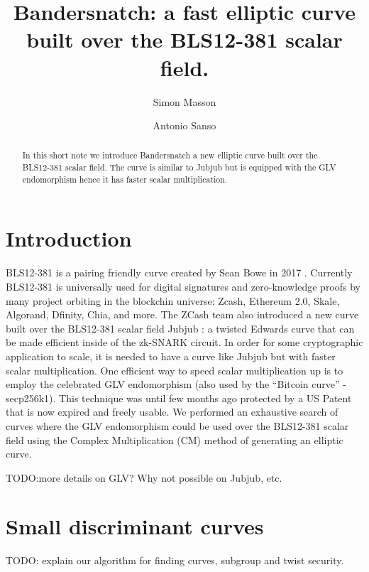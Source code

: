 \documentclass{amsart}
\newcommand{\SM}[1]{\color{blue}#1\color{black}}
\begin{document}
\title[Bandersnatch]{Bandersnatch: a fast elliptic curve built over the BLS12-381 scalar field.}
\author{Simon Masson}
\address{Heliax}
\author{Antonio Sanso}
\address{Ethereum Foundation and Ruhr Universit{\"a}t Bochum}


\maketitle
\medskip
\begin{abstract}
 In this short note we  introduce Bandersnatch a new elliptic curve built over the BLS12-381 \cite{bls12381} scalar field. The curve is similar to Jubjub \cite{jubjub} but is equipped with the GLV endomorphism \cite{10.1007/3-540-44647-8_11} hence it has faster scalar multiplication.
 \end{abstract}

\section{Introduction}
BLS12-381 is a pairing friendly curve created by Sean Bowe in 2017
\cite{bls12381}. Currently BLS12-381 is universally used for digital
signatures and zero-knowledge proofs by many project orbiting in the
blockchin universe: Zcash, Ethereum 2.0, Skale, Algorand, Dfinity,
Chia, and more.
The ZCash team also introduced a new curve built over the BLS12-381
scalar field Jubjub  \cite{jubjub}: a twisted Edwards curve that can
be made efficient inside of the zk-SNARK circuit.
In order for some cryptographic application to scale, it is needed to
have a curve like Jubjub but with faster scalar multiplication. One
efficient way to speed scalar multiplication up is to employ the
celebrated GLV endomorphism \cite{10.1007/3-540-44647-8_11} (also used
by the “Bitcoin curve” - secp256k1).
This technique was until few months ago protected by a US Patent that
is now expired and freely usable.
We performed an exhaustive search of curves where the GLV endomorphism
could be used over the BLS12-381 scalar field using the Complex
Multiplication (CM) method of generating an elliptic curve.

\SM{TODO:more details on GLV? Why not possible on Jubjub, etc.}

\section{Small discriminant curves}

\SM{TODO: explain our algorithm for finding curves, subgroup and twist
  security.}
\end{document}
